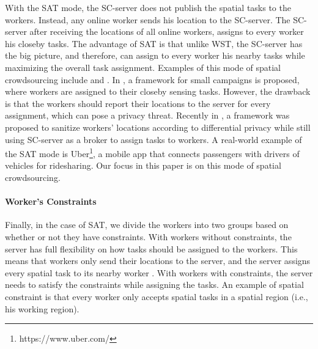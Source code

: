 \documentclass{USC-Thesis}
\numberwithin{equation}{chapter}
\begin{document}
With the SAT mode, the SC-server does not publish the spatial tasks to the workers. Instead, any online worker sends his location to the SC-server. The SC-server after receiving the locations of all online workers, assigns to every worker his closeby tasks. The advantage of SAT is that unlike WST, the SC-server has the big picture, and therefore, can assign to every worker his nearby tasks while maximizing the overall task assignment. Examples of this mode of spatial crowdsourcing include \cite{kazemi2012geocrowd} and \cite{kazemi2011privacy}. In \cite{kazemi2011privacy}, a framework for small campaigns is proposed, where workers are assigned to their closeby sensing tasks. However, the drawback is that the workers should report their locations to the server for every assignment, which can pose a privacy threat. Recently in \cite{to2014framework}, a framework was proposed to sanitize workers' locations according to differential privacy while still using SC-server as a broker to assign tasks to workers. A real-world example of the SAT mode is Uber\footnote{https://www.uber.com/}, a mobile app that connects passengers with drivers of vehicles for ridesharing. Our focus in this paper is on this mode of spatial crowdsourcing.

\paragraph{Worker's Constraints}
Finally, in the case of SAT, we divide the workers into two groups based on whether or not they have constraints. With workers without constraints, the server has full flexibility on how tasks should be assigned to the workers. This means that workers only send their locations to the server, and the server assigns every spatial task to its nearby worker \cite{kazemi2011privacy}. With workers with constraints, the server needs to satisfy the constraints while assigning the tasks. An example of spatial constraint is that every worker only accepts spatial tasks in a spatial region (i.e., his working region).
\end{document}
